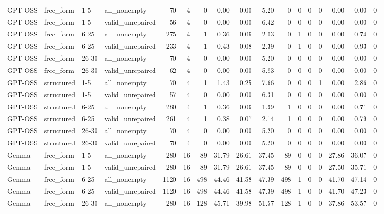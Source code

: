 \begin{longtable}{llllrrrrrrrrrrrrr}
GPT-OSS & free\_form & 1-5 & all\_nonempty & 70 & 4 & 0 & 0.00 & 0.00 & 5.20 & 0 & 0 & 0 & 0 & 0.00 & 0.00 & 0 \\
GPT-OSS & free\_form & 1-5 & valid\_unrepaired & 56 & 4 & 0 & 0.00 & 0.00 & 6.42 & 0 & 0 & 0 & 0 & 0.00 & 0.00 & 0 \\
GPT-OSS & free\_form & 6-25 & all\_nonempty & 275 & 4 & 1 & 0.36 & 0.06 & 2.03 & 0 & 1 & 0 & 0 & 0.00 & 0.74 & 0 \\
GPT-OSS & free\_form & 6-25 & valid\_unrepaired & 233 & 4 & 1 & 0.43 & 0.08 & 2.39 & 0 & 1 & 0 & 0 & 0.00 & 0.93 & 0 \\
GPT-OSS & free\_form & 26-30 & all\_nonempty & 70 & 4 & 0 & 0.00 & 0.00 & 5.20 & 0 & 0 & 0 & 0 & 0.00 & 0.00 & 0 \\
GPT-OSS & free\_form & 26-30 & valid\_unrepaired & 62 & 4 & 0 & 0.00 & 0.00 & 5.83 & 0 & 0 & 0 & 0 & 0.00 & 0.00 & 0 \\
GPT-OSS & structured & 1-5 & all\_nonempty & 70 & 4 & 1 & 1.43 & 0.25 & 7.66 & 0 & 0 & 0 & 1 & 0.00 & 2.86 & 0 \\
GPT-OSS & structured & 1-5 & valid\_unrepaired & 57 & 4 & 0 & 0.00 & 0.00 & 6.31 & 0 & 0 & 0 & 0 & 0.00 & 0.00 & 0 \\
GPT-OSS & structured & 6-25 & all\_nonempty & 280 & 4 & 1 & 0.36 & 0.06 & 1.99 & 1 & 0 & 0 & 0 & 0.00 & 0.71 & 0 \\
GPT-OSS & structured & 6-25 & valid\_unrepaired & 261 & 4 & 1 & 0.38 & 0.07 & 2.14 & 1 & 0 & 0 & 0 & 0.00 & 0.79 & 0 \\
GPT-OSS & structured & 26-30 & all\_nonempty & 70 & 4 & 0 & 0.00 & 0.00 & 5.20 & 0 & 0 & 0 & 0 & 0.00 & 0.00 & 0 \\
GPT-OSS & structured & 26-30 & valid\_unrepaired & 70 & 4 & 0 & 0.00 & 0.00 & 5.20 & 0 & 0 & 0 & 0 & 0.00 & 0.00 & 0 \\
Gemma & free\_form & 1-5 & all\_nonempty & 280 & 16 & 89 & 31.79 & 26.61 & 37.45 & 89 & 0 & 0 & 0 & 27.86 & 36.07 & 0 \\
Gemma & free\_form & 1-5 & valid\_unrepaired & 280 & 16 & 89 & 31.79 & 26.61 & 37.45 & 89 & 0 & 0 & 0 & 27.50 & 35.71 & 0 \\
Gemma & free\_form & 6-25 & all\_nonempty & 1120 & 16 & 498 & 44.46 & 41.58 & 47.39 & 498 & 1 & 0 & 0 & 41.70 & 47.14 & 0 \\
Gemma & free\_form & 6-25 & valid\_unrepaired & 1120 & 16 & 498 & 44.46 & 41.58 & 47.39 & 498 & 1 & 0 & 0 & 41.70 & 47.23 & 0 \\
Gemma & free\_form & 26-30 & all\_nonempty & 280 & 16 & 128 & 45.71 & 39.98 & 51.57 & 128 & 1 & 0 & 0 & 37.86 & 53.57 & 0 \\

\end{longtable}
